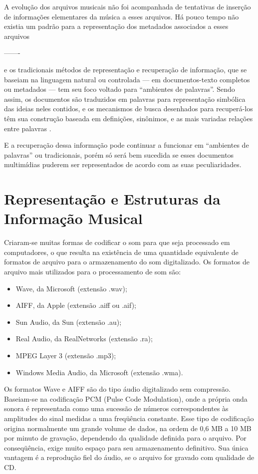 A evolução dos arquivos musicais não foi acompanhada de tentativas de inserção de informações elementares da música a esses arquivos. Há pouco tempo não existia um padrão para a representação dos metadados associados a esses arquivos \cite{andrade&crispim2008} 

-------

e os tradicionais métodos de representação e recuperação de informação, que se baseiam na linguagem natural ou controlada — em documentos-texto completos ou metadados — tem seu foco voltado para “ambientes de palavras”. Sendo assim, os documentos são traduzidos em palavras para representação simbólica das ideias neles contidos, e os mecanismos de busca desenhados para recuperá-los têm sua construção baseada em definições, sinônimos, e as mais variadas relações entre palavras \cite{lima&santini2006}.

E a recuperação dessa informação pode continuar a funcionar em “ambientes de palavras” ou tradicionais, porém só será bem sucedida se esses documentos multimídias puderem ser representados de acordo com as suas peculiaridades.

\section{Representação e Estruturas da Informação Musical}

Criaram-se muitas formas de codificar o som para que seja processado em computadores, o que resulta na existência de uma quantidade equivalente de formatos de arquivo para o armazenamento do som digitalizado. Os formatos de arquivo mais utilizados para o processamento de som são:

\begin{itemize}
   \item Wave, da Microsoft (extensão .wav);
   \item AIFF, da Apple (extensão .aiff ou .aif);
   \item Sun Audio, da Sun (extensão .au);
   \item Real Audio, da RealNetworks (extensão .ra);
   \item MPEG Layer 3 (extensão .mp3);
   \item Windows Media Audio, da Microsoft (extensão .wma).
 \end{itemize}
 
 Os formatos Wave e AIFF são do tipo áudio digitalizado sem compressão. Baseiam-se na codificação PCM (Pulse Code Modulation), onde a própria onda sonora é representada como uma sucessão de números correspondentes às amplitudes do sinal medidas a uma freqüência constante. Esse tipo de codificação origina normalmente um grande volume de dados, na ordem de 0,6 MB a 10 MB por minuto de gravação, dependendo da qualidade definida para o arquivo. Por conseqüência, exige muito espaço para seu armazenamento definitivo. Sua única vantagem é a reprodução fiel do áudio, se o arquivo for gravado com qualidade de CD.

